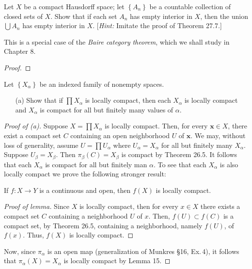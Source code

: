 \newpage
\begin{problem}[Munkres \S27, Ex.\,5]
Let $X$ be a compact Hausdorff space; let $\left\{A_n\right\}$ be
a countable collection of closed sets of $X$. Show that if each
set $A_n$ has empty interior in $X$, then the union $\bigcup A_n$
has empty interior in $X$. [\emph{Hint:} Imitate the proof of
Theorem 27.7.]

This is a special case of the \emph{Baire category theorem},
which we shall study in Chapter 8.
\end{problem}
\begin{proof}

\end{proof}
\newpage
\begin{problem}[Munkres \S29, Ex.\,2(a)]
Let $\left\{X_\alpha\right\}$ be an indexed family of nonempty
spaces.
\begin{itemize}
\item[(a)] Show that if $\prod X_\alpha$ is locally compact, then
  each $X_\alpha$ is locally compact and $X_\alpha$ is compact
  for all but finitely many values of $\alpha$.
\end{itemize}
\end{problem}
\begin{proof}[Proof of (a)]
Suppose $X=\prod X_\alpha$ is locally compact. Then, for every
$\mathbf{x}\in X$, there exist a compact set $C$ containing an open
neighborhood $U$ of $\mathbf{x}$. We may, without loss of generality,
assume $U=\prod U_\alpha$ where $U_\alpha=X_\alpha$ for all but
finitely many $X_\alpha$. Suppose $U_\beta=X_\beta$. Then
$\pi_\beta(C)=X_\beta$ is compact by Theorem 26.5. It follows that
each $X_\alpha$ is compact for all but finitely man $\alpha$. To see
that each $X_\alpha$ is also locally compact we prove the following
stronger result:
\begin{lemma}[Munkres \S20, Ex.\,3]
If $f\colon X\to Y$ is a continuous and open, then $f(X)$ is locally
compact.
\end{lemma}
\begin{proof}[Proof of lemma]
\renewcommand\qedsymbol{$\clubsuit$}
Since $X$ is locally compact, then for every $x\in X$ there exists a
compact set $C$ containing a neighborhood $U$ of $x$. Then,
$f(U)\subset f(C)$ is a compact set, by Theorem 26.5, containing a
neighborhood, namely $f(U)$, of $f(x)$. Thus, $f(X)$ is locally compact.
\end{proof}
Now, since $\pi_\alpha$ is an open map (generalization of Munkres
\S16, Ex.\,4), it follows that $\pi_\alpha(X)=X_\alpha$ is locally
compact by Lemma 15.
\end{proof}
